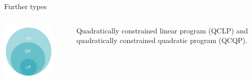 \documentclass[11pt,compress,t,notes=noshow, xcolor=table]{beamer}
\begin{document}
\begin{vbframe}{Further types}

\begin{columns}[T] %
	\begin{column}{.58\textwidth}
		\begin{center}
			\includegraphics[width=0.8\textwidth]{figure_man/classes_optimization_problems.png} 
		\end{center}
	\end{column}
	\begin{column}{.38\textwidth} \vspace*{1.5cm}
		Quadratically constrained linear program (QCLP) and quadratically constrained quadratic program (QCQP). 
	\end{column}
\end{columns}



\end{vbframe}
\end{document}
